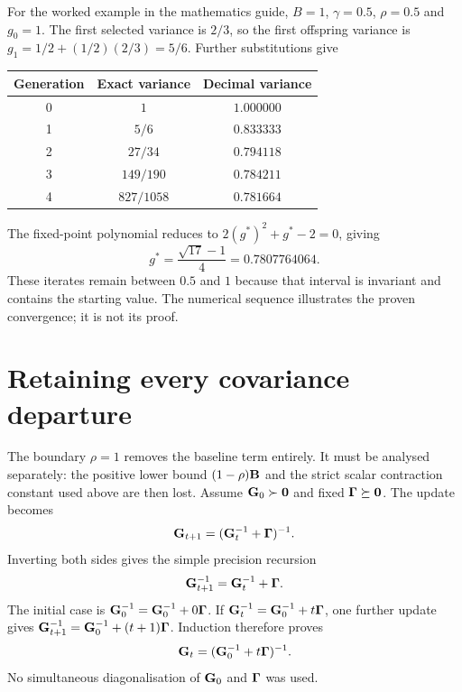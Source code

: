 For the worked example in the mathematics guide, $B=1$,
$\gamma=0.5$, $\rho=0.5$ and $g_0=1$. The first selected variance is
$2/3$, so the first offspring variance is
$g_1=1/2+(1/2)(2/3)=5/6$. Further substitutions give
\begin{center}
\begin{tabular}{ccc}
  \toprule
  Generation & Exact variance & Decimal variance\\
  \midrule
  0 & $1$ & $1.000000$\\
  1 & $5/6$ & $0.833333$\\
  2 & $27/34$ & $0.794118$\\
  3 & $149/190$ & $0.784211$\\
  4 & $827/1058$ & $0.781664$\\
  \bottomrule
\end{tabular}
\end{center}
The fixed-point polynomial reduces to
$2(g^*)^2+g^*-2=0$, giving
\begin{equation}
  g^*=\frac{\sqrt{17}-1}{4}=0.7807764064.
  \label{inheritance:guide-fixed-point}
\end{equation}
These iterates remain between $0.5$ and $1$ because that interval is
invariant and contains the starting value. The numerical sequence
illustrates the proven convergence; it is not its proof.

\section{Retaining every covariance departure}
\label{inheritance:rho-one}

The boundary $\rho=1$ removes the baseline term entirely. It must be
analysed separately: the positive lower bound $(1-\rho)\mathbf{B}$ and the
strict scalar contraction constant used above are then lost. Assume
$\mathbf{G}_0\succ\mathbf{0}$ and fixed $\boldsymbol{\Gamma}\succeq\mathbf{0}$. The update becomes
\begin{equation}
  \mathbf{G}_{t+1}=(\mathbf{G}_t^{-1}+\boldsymbol{\Gamma})^{-1}.
\end{equation}
Inverting both sides gives the simple precision recursion
\begin{equation}
  \mathbf{G}_{t+1}^{-1}=\mathbf{G}_t^{-1}+\boldsymbol{\Gamma}.
\end{equation}
The initial case is $\mathbf{G}_0^{-1}=\mathbf{G}_0^{-1}+0\boldsymbol{\Gamma}$.
If $\mathbf{G}_t^{-1}=\mathbf{G}_0^{-1}+t\boldsymbol{\Gamma}$, one further update gives
$\mathbf{G}_{t+1}^{-1}=\mathbf{G}_0^{-1}+(t+1)\boldsymbol{\Gamma}$.
Induction therefore proves
\begin{equation}
  \mathbf{G}_t=(\mathbf{G}_0^{-1}+t\boldsymbol{\Gamma})^{-1}.
  \label{inheritance:precision-iteration}
\end{equation}
No simultaneous diagonalisation of $\mathbf{G}_0$ and $\boldsymbol{\Gamma}$ was used.


